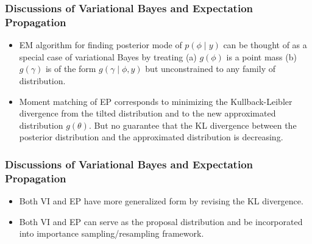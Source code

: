 \documentclass{beamer}
\begin{document}
\begin{frame}
  \frametitle{Discussions of Variational Bayes and Expectation Propagation}
  \begin{itemize}
  \item EM algorithm for finding posterior mode of $p(\phi \mid y)$ can be thought of as a special case of variational Bayes by treating (a) $g(\phi)$ is a point mass (b) $g(\gamma)$ is of the form $g(\gamma \mid \phi, y)$ but unconstrained to any family of distribution.
  \item Moment matching of EP corresponds to minimizing the Kullback-Leibler divergence from the tilted distribution and to the new approximated distribution $g(\theta)$. But no guarantee that the KL divergence between the posterior distribution and the approximated distribution is decreasing.
  \end{itemize}
\end{frame}


\begin{frame}
  \frametitle{Discussions of Variational Bayes and Expectation Propagation}
  \begin{itemize}
  \item Both VI and EP have more generalized form by revising the KL divergence.
  \item Both VI and EP can serve as the proposal distribution and be incorporated into importance sampling/resampling framework.
  \end{itemize}
  \end{frame}
\end{document}
